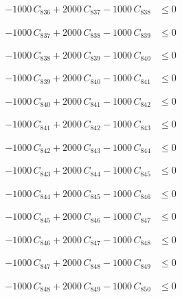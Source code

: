 \documentclass[a4paper,11pt]{article}
\begin{document}
\begin{align}
-1000\,C_{836} + 2000\,C_{837} - 1000\,C_{838} &\leq 0 \nonumber
\end{align}

\begin{align}
-1000\,C_{837} + 2000\,C_{838} - 1000\,C_{839} &\leq 0 \nonumber
\end{align}

\begin{align}
-1000\,C_{838} + 2000\,C_{839} - 1000\,C_{840} &\leq 0 \nonumber
\end{align}

\begin{align}
-1000\,C_{839} + 2000\,C_{840} - 1000\,C_{841} &\leq 0 \nonumber
\end{align}

\begin{align}
-1000\,C_{840} + 2000\,C_{841} - 1000\,C_{842} &\leq 0 \nonumber
\end{align}

\begin{align}
-1000\,C_{841} + 2000\,C_{842} - 1000\,C_{843} &\leq 0 \nonumber
\end{align}

\begin{align}
-1000\,C_{842} + 2000\,C_{843} - 1000\,C_{844} &\leq 0 \nonumber
\end{align}

\begin{align}
-1000\,C_{843} + 2000\,C_{844} - 1000\,C_{845} &\leq 0 \nonumber
\end{align}

\begin{align}
-1000\,C_{844} + 2000\,C_{845} - 1000\,C_{846} &\leq 0 \nonumber
\end{align}

\begin{align}
-1000\,C_{845} + 2000\,C_{846} - 1000\,C_{847} &\leq 0 \nonumber
\end{align}

\begin{align}
-1000\,C_{846} + 2000\,C_{847} - 1000\,C_{848} &\leq 0 \nonumber
\end{align}

\begin{align}
-1000\,C_{847} + 2000\,C_{848} - 1000\,C_{849} &\leq 0 \nonumber
\end{align}

\begin{align}
-1000\,C_{848} + 2000\,C_{849} - 1000\,C_{850} &\leq 0 \nonumber
\end{align}
\end{document}
